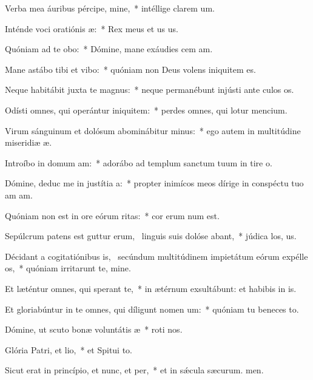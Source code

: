 \item Verba mea áuribus pércipe, mine,~* intéllige clarem um.
\item Inténde voci oratiónis æ:~* Rex meus et us us.
\item Quóniam ad te obo:~* Dómine, mane exáudies cem am.
\item Mane astábo tibi et vibo:~* quóniam non Deus volens iniquitem  es.
\item Neque habitábit juxta te magnus:~* neque permanébunt injústi ante culos os.
\item Odísti omnes, qui operántur iniquitem:~* perdes omnes, qui lotur mencium.
\item Virum sánguinum et dolósum abominábitur minus:~* ego autem in multitúdine miseridiæ æ.
\item Introíbo in domum am:~* adorábo ad templum sanctum tuum in tire o.
\item Dómine, deduc me in justítia a:~* propter inimícos meos dírige in conspéctu tuo am am.
\item Quóniam non est in ore eórum ritas:~* cor erum num est.
\item Sepúlcrum patens est guttur erum,~\pscross{} linguis suis dolóse abant,~* júdica los, us.
\item Décidant a cogitatiónibus is,~\pscross{} secúndum multitúdinem impietátum eórum expélle os,~* quóniam irritarunt te, mine.
\item Et læténtur omnes, qui sperant  te,~* in ætérnum exsultábunt: et habibis in is.
\item Et gloriabúntur in te omnes, qui díligunt nomen um:~* quóniam tu beneces to.
\item Dómine, ut scuto bonæ voluntátis æ~* roti nos.
\item Glória Patri, et lio,~* et Spitui to.
\item Sicut erat in princípio, et nunc, et per,~* et in sǽcula sæcurum. men.
